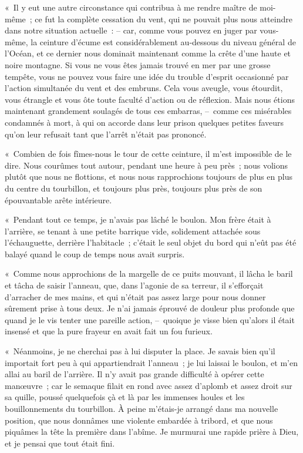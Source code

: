 \documentclass[french,twoside]{book} %
\begin{document}
« Il y eut une autre circonstance qui contribua à me rendre maître de moi-même ; ce fut la complète cessation du vent, qui ne pouvait plus nous atteindre dans notre situation actuelle : – car, comme vous pouvez en juger par vous-même, la ceinture d’écume est considérablement au-dessous du niveau général de l’Océan, et ce dernier nous dominait maintenant comme la crête d’une haute et noire montagne. Si vous ne vous êtes jamais trouvé en mer par une grosse tempête, vous ne pouvez vous faire une idée du trouble d’esprit occasionné par l’action simultanée du vent et des embruns. Cela vous aveugle, vous étourdit, vous étrangle et vous ôte toute faculté d’action ou de réflexion. Mais nous étions maintenant grandement soulagés de tous ces embarras, – comme ces misérables condamnés à mort, à qui on accorde dans leur prison quelques petites faveurs qu’on leur refusait tant que l’arrêt n’était pas prononcé.\par
« Combien de fois fîmes-nous le tour de cette ceinture, il m’est impossible de le dire. Nous courûmes tout autour, pendant une heure à peu près ; nous volions plutôt que nous ne flottions, et nous nous rapprochions toujours de plus en plus du centre du tourbillon, et toujours plus près, toujours plus près de son épouvantable arête intérieure.\par
« Pendant tout ce temps, je n’avais pas lâché le boulon. Mon frère était à l’arrière, se tenant à une petite barrique vide, solidement attachée sous l’échauguette, derrière l’habitacle ; c’était le seul objet du bord qui n’eût pas été balayé quand le coup de temps nous avait surpris.\par
« Comme nous approchions de la margelle de ce puits mouvant, il lâcha le baril et tâcha de saisir l’anneau, que, dans l’agonie de sa terreur, il s’efforçait d’arracher de mes mains, et qui n’était pas assez large pour nous donner sûrement prise à tous deux. Je n’ai jamais éprouvé de douleur plus profonde que quand je le vis tenter une pareille action, – quoique je visse bien qu’alors il était insensé et que la pure frayeur en avait fait un fou furieux.\par
« Néanmoins, je ne cherchai pas à lui disputer la place. Je savais bien qu’il importait fort peu à qui appartiendrait l’anneau ; je lui laissai le boulon, et m’en allai au baril de l’arrière. Il n’y avait pas grande difficulté à opérer cette manœuvre ; car le semaque filait en rond avec assez d’aplomb et assez droit sur sa quille, poussé quelquefois çà et là par les immenses houles et les bouillonnements du tourbillon. À peine m’étais-je arrangé dans ma nouvelle position, que nous donnâmes une violente embardée à tribord, et que nous piquâmes la tête la première dans l’abîme. Je murmurai une rapide prière à Dieu, et je pensai que tout était fini.\par
\end{document}
